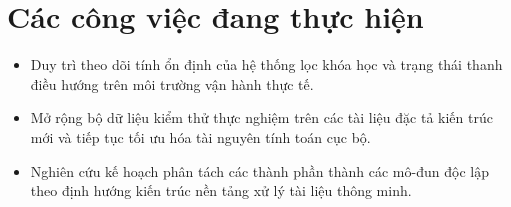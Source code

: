 \section{Các công việc đang thực hiện}
\begin{itemize}
    \item Duy trì theo dõi tính ổn định của hệ thống lọc khóa học và trạng thái thanh điều hướng trên môi trường vận hành thực tế.
    \item Mở rộng bộ dữ liệu kiểm thử thực nghiệm trên các tài liệu đặc tả kiến trúc mới và tiếp tục tối ưu hóa tài nguyên tính toán cục bộ.
    \item Nghiên cứu kế hoạch phân tách các thành phần thành các mô-đun độc lập theo định hướng kiến trúc nền tảng xử lý tài liệu thông minh.
\end{itemize}
